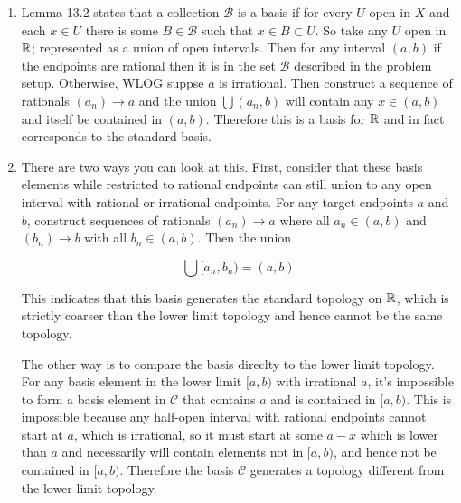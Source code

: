 \documentclass{article}
\begin{document}
\begin{enumerate}[label=\alph*)]
  \item Lemma 13.2 states that a collection $\mathscr{B}$ is a basis if for every $U$ open in $X$ and each $x \in U$ there is some $B \in \mathscr{B}$ such that $x \in B \subset U$. So take any $U$ open in $\mathbb{R}$; represented as a union of open intervals. Then for any interval $(a, b)$ if the endpoints are rational then it is in the set $\mathscr{B}$ described in the problem setup. Otherwise, WLOG suppse $a$ is irrational. Then construct a sequence of rationals $(a_n) \to a$ and the union $\bigcup (a_n, b)$ will contain any $x \in (a, b)$ and itself be contained in $(a, b)$. Therefore this is a basis for $\mathbb{R}$ and in fact corresponds to the standard basis.
  \item There are two ways you can look at this. First, consider that these basis elements while restricted to rational endpoints can still union to any open interval with rational or irrational endpoints. For any target endpoints $a$ and $b$, construct sequences of rationals $(a_n) \to a$ where all $a_n \in (a, b)$ and $(b_n) \to b$ with all $b_n \in (a, b)$. Then the union

        $$\bigcup [a_n, b_n) = (a, b)$$

        This indicates that this basis generates the standard topology on $\mathbb{R}$, which is strictly coarser than the lower limit topology and hence cannot be the same topology.

        The other way is to compare the basis direclty to the lower limit topology. For any basis element in the lower limit $[a, b)$ with irrational $a$, it's impossible to form a basis element in $\mathscr{C}$ that contains $a$ and is contained in $[a, b)$. This is impossible because any half-open interval with rational endpoints cannot start at $a$, which is irrational, so it must start at some $a - x$ which is lower than $a$ and necessarily will contain elements not in $[a, b)$, and hence not be contained in $[a, b)$. Therefore the basis $\mathscr{C}$ generates a topology different from the lower limit topology.

\end{enumerate}
\end{document}
